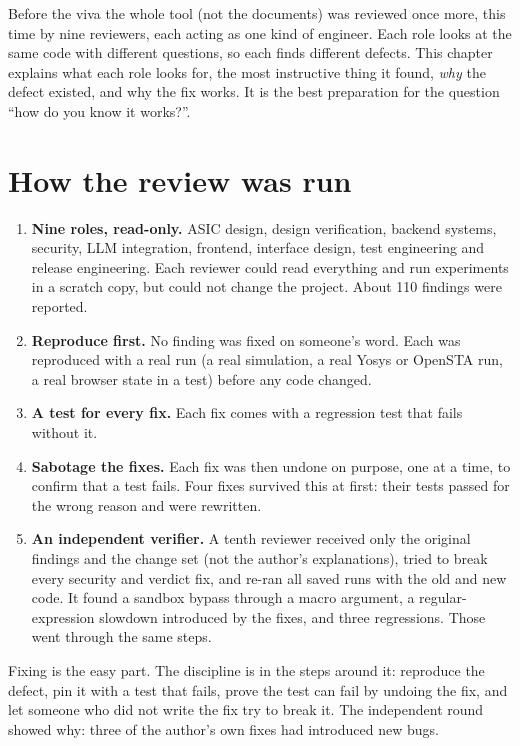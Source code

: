 Before the viva the whole tool (not the documents) was reviewed once more, this time by nine reviewers, each acting as one kind of engineer. Each role looks at the same code with different questions, so each finds different defects. This chapter explains what each role looks for, the most instructive thing it found, \emph{why} the defect existed, and why the fix works. It is the best preparation for the question ``how do you know it works?''.

\section{How the review was run}

\begin{enumerate}
  \item \textbf{Nine roles, read-only.} ASIC design, design verification, backend systems, security, LLM integration, frontend, interface design, test engineering and release engineering. Each reviewer could read everything and run experiments in a scratch copy, but could not change the project. About 110 findings were reported.
  \item \textbf{Reproduce first.} No finding was fixed on someone's word. Each was reproduced with a real run (a real simulation, a real Yosys or OpenSTA run, a real browser state in a test) before any code changed.
  \item \textbf{A test for every fix.} Each fix comes with a regression test that fails without it.
  \item \textbf{Sabotage the fixes.} Each fix was then undone on purpose, one at a time, to confirm that a test fails. Four fixes survived this at first: their tests passed for the wrong reason and were rewritten.
  \item \textbf{An independent verifier.} A tenth reviewer received only the original findings and the change set (not the author's explanations), tried to break every security and verdict fix, and re-ran all saved runs with the old and new code. It found a sandbox bypass through a macro argument, a regular-expression slowdown introduced by the fixes, and three regressions. Those went through the same steps.
\end{enumerate}

\begin{keyidea}
Fixing is the easy part. The discipline is in the steps around it: reproduce the defect, pin it with a test that fails, prove the test can fail by undoing the fix, and let someone who did not write the fix try to break it. The independent round showed why: three of the author's own fixes had introduced new bugs.
\end{keyidea}

